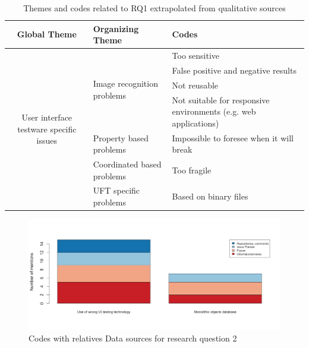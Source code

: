 \begin{table}
\renewcommand{\arraystretch}{1.5}
\centering
\begin{tabular}{ c p{4.3cm} p{4.6cm}}

    \hline
    {\large Global Theme} & {\large Organizing Theme} & {\large Codes}\\
    \hline

    \multirow{7}{*}{\parbox[b]{4.3cm}{
        User interface testware specific issues
    }
    } & \multirow{4}{*}{\parbox[c]{4.3cm}{Image recognition problems}}
        & Too sensitive \\
        & & False positive and negative results\\
        & & Not reusable\\
        & & Not suitable for responsive environments (e.g. web applications)\\ \cline{2-3}

    & Property based problems & Impossible to foresee when it will break\\ \cline{2-3}

    & Coordinated based problems  & Too fragile\\ \cline{2-3}

    & UFT specific problems & Based on binary files\\

    \hline
\end{tabular}
\caption{Themes and codes related to RQ1 extrapolated from qualitative sources}
\label{tab:themes_rq2}
\end{table}

\begin{figure}[!htbp]
    \centering
    \includegraphics[width=\textwidth,keepaspectratio]{figure/results/rq2/sources.png}
    \caption{Codes with relatives Data sources for research question 2}
    \label{fig:rq2_sources}
\end{figure}



